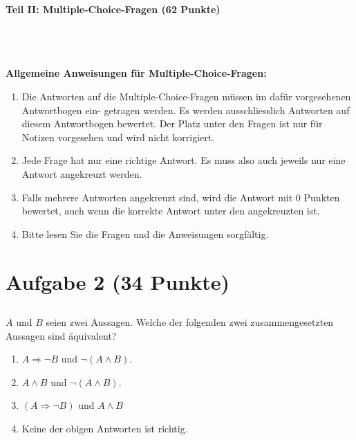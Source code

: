 \newpage


\begin{Large}
\textbf{Teil II: Multiple-Choice-Fragen (62 Punkte)}
\end{Large}
\\
\\
\\
\textbf{Allgemeine Anweisungen für Multiple-Choice-Fragen:}
\\
\renewcommand{\labelenumi}{(\roman{enumi})}
\begin{enumerate}
\item
Die Antworten auf die Multiple-Choice-Fragen müssen im dafür vorgesehenen Antwortbogen ein-
getragen werden. Es werden ausschliesslich Antworten auf diesem Antwortbogen bewertet. Der
Platz unter den Fragen ist nur für Notizen vorgesehen und wird nicht korrigiert.

\item
Jede Frage hat nur eine richtige Antwort. Es muss also auch jeweils nur eine Antwort angekreuzt werden.

\item
Falls mehrere Antworten angekreuzt sind, wird die Antwort mit 0 Punkten bewertet, auch wenn
die korrekte Antwort unter den angekreuzten ist.

\item
Bitte lesen Sie die Fragen und die Anweisungen sorgfältig.

\end{enumerate}
\newpage
\section*{Aufgabe 2 (34 Punkte)}
\vspace{0.4cm}

\subsection*{}
$ A $ und $ B $ seien zwei Aussagen. Welche der folgenden zwei zusammengesetzten Aussagen sind äquivalent? 
 \renewcommand{\labelenumi}{(\alph{enumi})}
\begin{enumerate}
\item $ A \Rightarrow   \neg B $ und $\neg (A \wedge B)$.
\item $ A \wedge B $ und $\neg (A \wedge B)$.
\item $ (A \Rightarrow \neg B) $ und $A \wedge B$
\item Keine der obigen Antworten ist richtig.
\end{enumerate}
\ \\
